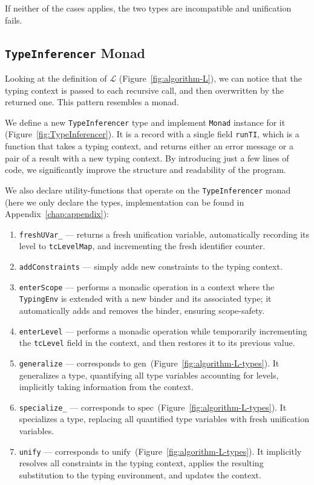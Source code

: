If neither of the cases applies, the two types are incompatible and unification fails.

\subsection{\texttt{TypeInferencer} Monad}

Looking at the definition of $\mathcal{L}$ (Figure~\ref{fig:algorithm-L}), we can notice that the typing context is passed to each recursive call, and then overwritten by the returned one. This pattern resembles a monad.

We define a new \texttt{TypeInferencer} type and implement \texttt{Monad} instance for it (Figure~\ref{fig:TypeInferencer}). It is a record with a single field \texttt{runTI}, which is a function that takes a typing context, and returns either an error message or a pair of a result with a new typing context. By introducing just a few lines of code, we significantly improve the structure and readability of the program.

We also declare utility-functions that operate on the \texttt{TypeInferencer} monad (here we only declare the types, implementation can be found in Appendix~\ref{chap:appendix}):

\begin{enumerate}
  \item \texttt{freshUVar\_} — returns a fresh unification variable, automatically recording its level to \texttt{tcLevelMap}, and incrementing the fresh identifier counter.
  \item \texttt{addConstraints} — simply adds new constraints to the typing context.
  \item \texttt{enterScope} — performs a monadic operation in a context where the \texttt{TypingEnv} is extended with a new binder and its associated type; it automatically adds and removes the binder, ensuring scope-safety.
  \item \texttt{enterLevel} — performs a monadic operation while temporarily incrementing the \texttt{tcLevel} field in the context, and then restores it to its previous value.
  \item \texttt{generalize} — corresponds to $\mathrm{gen}$~(Figure~\ref{fig:algorithm-L-types}). It generalizes a type, quantifying all type variables accounting for levels, implicitly taking information from the context.
  \item \texttt{specialize\_} — corresponds to $\mathrm{spec}$~(Figure~\ref{fig:algorithm-L-types}). It specializes a type, replacing all quantified type variables with fresh unification variables.
  \item \texttt{unify} — corresponds to $\mathrm{unify}$~(Figure~\ref{fig:algorithm-L-types}). It implicitly resolves all constraints in the typing context, applies the resulting substitution to the typing environment, and updates the context.
\end{enumerate}

